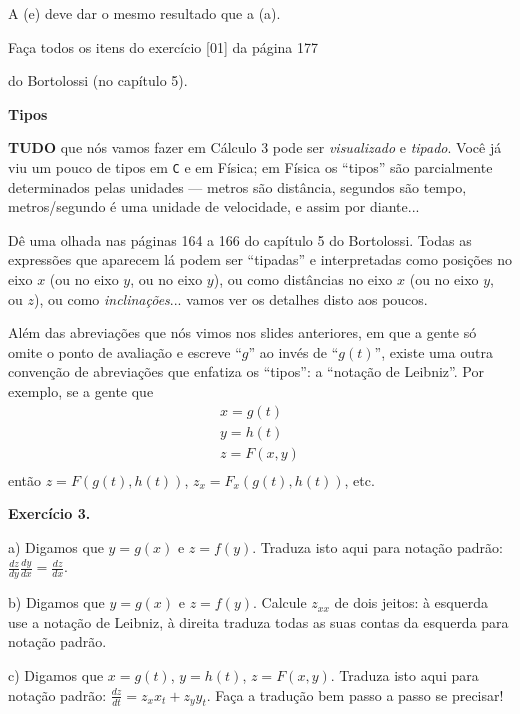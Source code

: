 \documentclass[oneside,12pt]{article}
\begin{document}
A (e) deve dar o mesmo resultado que a (a).

\msk

Faça todos os itens do exercício [01] da página 177

do Bortolossi (no capítulo 5).


\newpage

{\bf Tipos}

\ssk

{\bf TUDO} que nós vamos fazer em Cálculo 3 pode ser {\sl visualizado}
e {\sl tipado}. Você já viu um pouco de tipos em {\tt C} e em Física;
em Física os ``tipos'' são parcialmente determinados pelas unidades
--- metros são distância, segundos são tempo, metros/segundo é uma
unidade de velocidade, e assim por diante...

Dê uma olhada nas páginas 164 a 166 do capítulo 5 do Bortolossi. Todas
as expressões que aparecem lá podem ser ``tipadas'' e interpretadas
como posições no eixo $x$ (ou no eixo $y$, ou no eixo $y$), ou como
distâncias no eixo $x$ (ou no eixo $y$, ou $z$), ou como {\sl
  inclinações}... vamos ver os detalhes disto aos poucos.

\newpage

Além das abreviações que nós vimos nos slides anteriores, em que a
gente só omite o ponto de avaliação e escreve ``$g$'' ao invés de
``$g(t)$'', existe uma outra convenção de abreviações que enfatiza os
``tipos'': a ``notação de Leibniz''. Por exemplo, se a gente
 que
%
$$\begin{array}{rcl}
  x = g(t) \\
  y = h(t) \\
  z = F(x,y) \\
  \end{array}
$$
%
então $z=F(g(t),h(t))$, $z_x = F_x(g(t),h(t))$, etc.

\newpage

{\bf Exercício 3.}

\ssk

a) Digamos que $y = g(x)$ e $z = f(y)$. Traduza isto aqui para notação
padrão: $\frac{dz}{dy} \frac{dy}{dx} = \frac{dz}{dx}$.

b) Digamos que $y = g(x)$ e $z = f(y)$. Calcule $z_{xx}$ de dois
jeitos: à esquerda use a notação de Leibniz, à direita traduza todas
as suas contas da esquerda para notação padrão.

c) Digamos que $x = g(t)$, $y = h(t)$, $z = F(x,y)$. Traduza isto aqui
para notação padrão: $\frac{dz}{dt} = z_x x_t + z_y y_t$. Faça a
tradução bem passo a passo se precisar!
\end{document}
